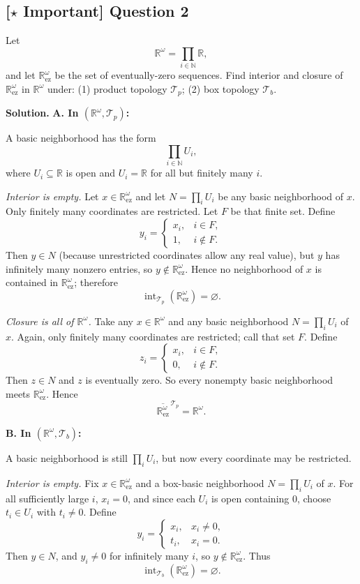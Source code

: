 \documentclass{article}
\newcommand{\R}{\mathbb{R}}
\newcommand{\N}{\mathbb{N}}
\newcommand{\important}{\texorpdfstring{\textbf{[\(\star\) Important]}}{[Important]}}
\newenvironment{solution}{\par\noindent\textbf{Solution.}\quad}{\par}
\begin{document}
\subsection{\important{} Question 2}

Let
\[
  \R^\omega=\prod_{i\in\N}\R,
\]
and let $\R^\omega_{\mathrm{ez}}$ be the set of eventually-zero sequences.
Find interior and closure of $\R^\omega_{\mathrm{ez}}$ in $\R^\omega$ under:
(1) product topology $\mathcal{T}_p$;
(2) box topology $\mathcal{T}_b$.

\begin{solution}
  \textbf{A. In $(\R^\omega,\mathcal{T}_p)$:}

  A basic neighborhood has the form
  \[
    \prod_{i\in\N}U_i,
  \]
  where $U_i\subseteq\R$ is open and $U_i=\R$ for all but finitely many $i$.

  \emph{Interior is empty.}
  Let $x\in \R^\omega_{\mathrm{ez}}$ and let $N=\prod_i U_i$ be any
  basic neighborhood of $x$.
  Only finitely many coordinates are restricted. Let $F$ be that finite set.
  Define
  \[
    y_i=
    \begin{cases}
      x_i,& i\in F,\\
      1,& i\notin F.
    \end{cases}
  \]
  Then $y\in N$ (because unrestricted coordinates allow any real
  value), but $y$ has infinitely many nonzero entries, so $y\notin
  \R^\omega_{\mathrm{ez}}$.
  Hence no neighborhood of $x$ is contained in
  $\R^\omega_{\mathrm{ez}}$; therefore
  \[
    \operatorname{int}_{\mathcal{T}_p}(\R^\omega_{\mathrm{ez}})=\varnothing.
  \]

  \emph{Closure is all of $\R^\omega$.}
  Take any $x\in\R^\omega$ and any basic neighborhood $N=\prod_i U_i$ of $x$.
  Again, only finitely many coordinates are restricted; call that set $F$.
  Define
  \[
    z_i=
    \begin{cases}
      x_i,& i\in F,\\
      0,& i\notin F.
    \end{cases}
  \]
  Then $z\in N$ and $z$ is eventually zero.
  So every nonempty basic neighborhood meets $\R^\omega_{\mathrm{ez}}$.
  Hence
  \[
    \overline{\R^\omega_{\mathrm{ez}}}^{\,\mathcal{T}_p}=\R^\omega.
  \]

  \textbf{B. In $(\R^\omega,\mathcal{T}_b)$:}

  A basic neighborhood is still $\prod_i U_i$, but now every
  coordinate may be restricted.

  \emph{Interior is empty.}
  Fix $x\in\R^\omega_{\mathrm{ez}}$ and a box-basic neighborhood
  $N=\prod_i U_i$ of $x$.
  For all sufficiently large $i$, $x_i=0$, and since each $U_i$ is
  open containing $0$, choose $t_i\in U_i$ with $t_i\ne 0$.
  Define
  \[
    y_i=
    \begin{cases}
      x_i,& x_i\ne 0,\\
      t_i,& x_i=0.
    \end{cases}
  \]
  Then $y\in N$, and $y_i\ne 0$ for infinitely many $i$, so $y\notin
  \R^\omega_{\mathrm{ez}}$.
  Thus
  \[
    \operatorname{int}_{\mathcal{T}_b}(\R^\omega_{\mathrm{ez}})=\varnothing.
  \]


\end{solution}
\end{document}
